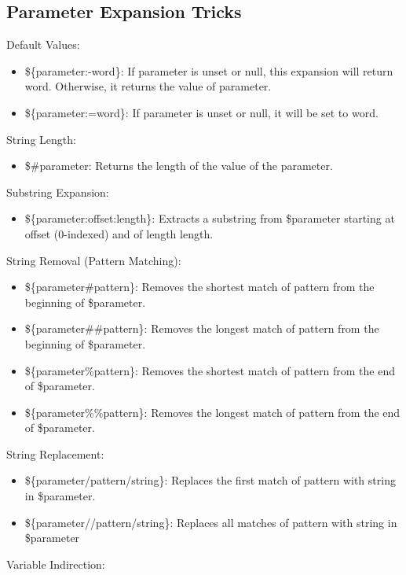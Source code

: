\documentclass{report}
\begin{document}
    \subsection{Parameter Expansion Tricks}
    \bigbreak \noindent 
    Default Values:
    \begin{itemize}
        \item \$\{parameter:-word\}: If parameter is unset or null, this expansion will return word. Otherwise, it returns the value of parameter.
        \item \$\{parameter:=word\}: If parameter is unset or null, it will be set to word.
    \end{itemize}
    \bigbreak \noindent 
    String Length:
    \begin{itemize}
        \item \${\#parameter}: Returns the length of the value of the parameter.
    \end{itemize}
    \bigbreak \noindent 
    Substring Expansion:
    \begin{itemize}
        \item \$\{parameter:offset:length\}: Extracts a substring from \$parameter starting at offset (0-indexed) and of length length.
    \end{itemize}
    \bigbreak \noindent 
    String Removal (Pattern Matching):
    \begin{itemize}
        \item \$\{parameter\#pattern\}: Removes the shortest match of pattern from the beginning of \$parameter.
        \item \$\{parameter\#\#pattern\}: Removes the longest match of pattern from the beginning of \$parameter.
        \item \$\{parameter\%pattern\}: Removes the shortest match of pattern from the end of \$parameter.
        \item \$\{parameter\%\%pattern\}: Removes the longest match of pattern from the end of \$parameter. 
    \end{itemize}
    \bigbreak \noindent 
    String Replacement:
    \begin{itemize}
        \item \$\{parameter/pattern/string\}: Replaces the first match of pattern with string in \$parameter.
        \item \$\{parameter//pattern/string\}: Replaces all matches of pattern with string in \$parameter
    \end{itemize}
    \bigbreak \noindent 
    Variable Indirection:
\end{document}
